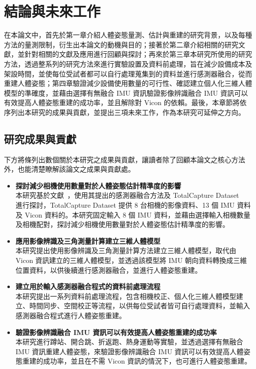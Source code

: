 \chapter{結論與未來工作}
\fontsize{12pt}{18pt}\selectfont

在本論文中，首先於第一章介紹人體姿態量測、估計與重建的研究背景，以及每種方法的量測限制，衍生出本論文的動機與目的；接著於第二章介紹相關的研究文獻，並針對相關的文獻及應用進行回顧與探討；再來於第三章本研究所使用的研究方法，透過整系列的研究方法來進行實驗設置及資料前處理，旨在減少設備成本及架設時間，並使每位受試者都可以自行處理蒐集到的資料並進行感測器融合，從而重建人體姿態；第四章驗證減少設備使用數量的可行性、確認建立個人化三維人體模型的準確度，並藉由選擇有無融合 IMU 資訊驗證影像辨識融合 IMU 資訊可以有效提高人體姿態重建的成功率，並且解除對 Vicon 的依賴。最後，本章節將依序列出本研究的成果與貢獻，並提出三項未來工作，作為本研究可延伸之方向。

\section{研究成果與貢獻}
下方將條列出數個關於本研究之成果與貢獻，讓讀者除了回顧本論文之核心方法外，也能清楚瞭解該論文之成果與貢獻處。

\begin{itemize}
    \item \textbf{探討減少相機使用數量對於人體姿態估計精準度的影響}
    \\ 本研究基於文獻~\cite{Zhang_2020_CVPR}，使用其提出的感測器融合方法及 TotalCapture Dataset ~\cite{Trumble:BMVC:2017} 進行探討，TotalCapture Dataset 提供 8 台相機的影像資料、13 個 IMU 資料及 Vicon 資料的。本研究固定輸入 8 個 IMU 資料，並藉由選擇輸入相機數量及相機配對，探討減少相機使用數量對於人體姿態估計精準度的影響。
    \clearpage
    \item \textbf{應用影像辨識及三角測量計算建立三維人體模型}
    \\ 本研究提出使用影像辨識及三角測量計算方法建立三維人體模型，取代由 Vicon 資訊建立的三維人體模型，並透過該模型將 IMU 朝向資料轉換成三維位置資料，以供後續進行感測器融合，並進行人體姿態重建。
    \item \textbf{建立用於輸入感測器融合程式的資料前處理流程}
    \\ 本研究提出一系列資料前處理流程，包含相機校正、個人化三維人體模型建立、時間同步、空間校正等流程，以供每位受試者皆可自行處理資料，並輸入感測器融合程式進行人體姿態重建。
    \item \textbf{驗證影像辨識融合 IMU 資訊可以有效提高人體姿態重建的成功率}
    \\ 本研究進行蹲站、開合跳、折返跑、熱身運動等實驗，並透過選擇有無融合 IMU 資訊重建人體姿態，來驗證影像辨識融合 IMU 資訊可以有效提高人體姿態重建的成功率，並且在不需 Vicon 資訊的情況下，也可進行人體姿態重建。
\end{itemize}


